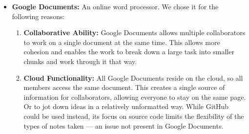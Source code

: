 \documentclass[11pt,onside]{report}
\begin{document}
\begin{itemize}
\begin{enumerate}
        \item \textbf{Wiki Features:} GitHub has a built-in wiki feature that allows collaborators to create wikis and glossaries for their projects. It's also a great place to keep documentation regarding the software. Since a glossary is already a requirement for the deliverables, this seemed like a great feature to use. It also allowed us to slowly create parts of the report as the project progressed, so the report only involves us porting the information we have from the Wiki to a \LaTeX{} report.
    \end{enumerate}
    
    \item \textbf{Google Documents:} An online word processor. We chose it for the following reasons:
    
    \begin{enumerate}
        \item \textbf{Collaborative Ability:} Google Documents allows multiple collaborators to work on a single document at the same time. This allows more cohesion and enables the work to break down a large task into smaller chunks and work through it that way.
        
        \item \textbf{Cloud Functionality:} All Google Documents reside on the cloud, so all members access the same document. This creates a single source of information for collaborators, allowing everyone to stay on the same page. Or to jot down ideas in a relatively unformatted way. While GitHub could be used instead, its focus on source code limits the flexibility of the types of notes taken — an issue not present in Google Documents.
    \end{enumerate}
\end{itemize}
\end{document}
